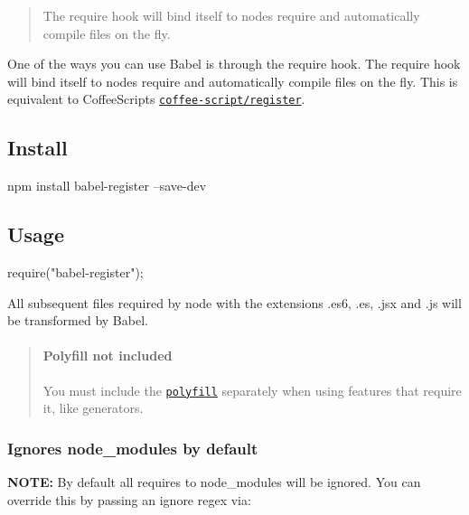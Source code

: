 \begin{quote}
The require hook will bind itself to node\textquotesingle{}s require and automatically compile files on the fly. \end{quote}


One of the ways you can use Babel is through the require hook. The require hook will bind itself to node\textquotesingle{}s {\ttfamily require} and automatically compile files on the fly. This is equivalent to Coffee\+Script\textquotesingle{}s \href{http://coffeescript.org/documentation/docs/register.html}{\tt coffee-\/script/register}.

\subsection*{Install}


\begin{DoxyCode}
npm install babel-register --save-dev
\end{DoxyCode}


\subsection*{Usage}


\begin{DoxyCode}
require("babel-register");
\end{DoxyCode}


All subsequent files required by node with the extensions {\ttfamily .es6}, {\ttfamily .es}, {\ttfamily .jsx} and {\ttfamily .js} will be transformed by Babel.

\begin{quote}
\paragraph*{Polyfill not included}



You must include the \href{https://babeljs.io/docs/usage/polyfill/}{\tt polyfill} separately when using features that require it, like generators. 

\end{quote}


\subsubsection*{Ignores {\ttfamily node\+\_\+modules} by default}

{\bfseries N\+O\+TE\+:} By default all requires to {\ttfamily node\+\_\+modules} will be ignored. You can override this by passing an ignore regex via\+:



